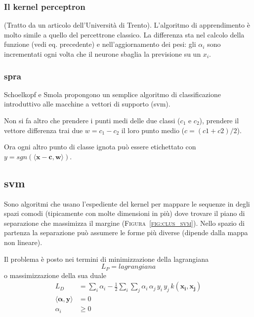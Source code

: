 \subsubsection {Il kernel perceptron}
(Tratto da un articolo dell'Universit\`a di Trento).
L'algoritmo di apprendimento \`e molto simile
a quello del percettrone classico.
La differenza sta nel calcolo della funzione (vedi eq. precedente)
e nell'aggiornamento dei pesi:
gli $\alpha_i$ sono incrementati ogni volta che
il neurone sbaglia la previsione su un $x_i$.


\subsubsection {\acf{spra}}
Schoelkopf e Smola propongono un semplice algoritmo di classificazione
introduttivo alle macchine a vettori di supporto (\ac{svm}).

Non si fa altro che prendere i punti medi delle due classi ($c_1$ e $c_2$),
prendere il vettore differenza trai due $w=c_1-c_2$
il loro punto medio ($c=(c1+c2)/2$).

Ora ogni altro punto di classe ignota
pu\`o essere etichettato con
\(y =sgn \left( \langle \boldsymbol{x-c}, \boldsymbol{w} \rangle \right)\).



\subsection {\acf{svm}}
Sono algoritmi che usano l'espediente del kernel
per mappare le sequenze in degli spazi comodi
(tipicamente con molte dimensioni in pi\`u)
dove trovare il piano di separazione che massimizza il margine (\textsc{Figura~\ref{fig:clus_svm}}).
Nello spazio di partenza la separazione pu\`o assumere le forme pi\`u diverse
(dipende dalla mappa non lineare).

Il problema \`e posto nei termini di minimizzazione della lagrangiana
\begin{equation}
    L_P = lagrangiana
  \label{eq:lagrangiana}
\end{equation}
o massimizzazione della sua duale
\begin{align}
  \label{eq:lagr_duale}
  L_D &= \sum_i \alpha_i - \frac{1}{2} \sum_i \sum_j \alpha_i \,\alpha_j \,y_i \,y_j \,k(\boldsymbol{x_i}, \boldsymbol{x_j}) \\
  \langle \boldsymbol{\alpha}, \boldsymbol{y} \rangle &= 0 \\
  \alpha_i &\geq 0
\end{align}


